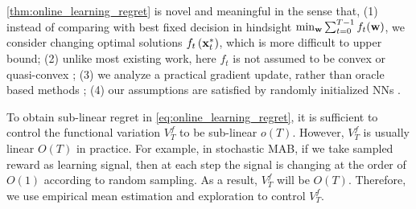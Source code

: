 \cref{thm:online_learning_regret} is novel and meaningful in the sense that, (1) instead of comparing with best fixed decision in hindsight $\min_{{\mathbf{w}}}{\sum_{t=0}^{T-1}{f_t({\mathbf{w}})} }$, we consider changing optimal solutions $f_t\left( {\mathbf{x}}_t^* \right)$, which is more difficult to upper bound; (2) unlike most existing work, here $f_t$ is not assumed to be convex \citep{yang2016tracking} or quasi-convex \citep{gao2018online}; (3) we analyze a practical gradient update, rather than oracle based methods \citep{suggala2019online,agarwal2019learning}; (4) our assumptions are satisfied by randomly initialized NNs \citep{li2018learning,allen2018convergenceB}.

To obtain sub-linear regret in \cref{eq:online_learning_regret}, it is sufficient to control the functional variation $V_T^f$ to be sub-linear $o(T)$. However, $V_T^f$ is usually linear $O(T)$ in practice. For example, in stochastic MAB, if we take sampled reward as learning signal, then at each step the signal is changing at the order of $O(1)$ according to random sampling. As a result, $V_T^f$ will be $O(T)$. Therefore, we use empirical mean estimation and exploration to control $V_T^f$.
